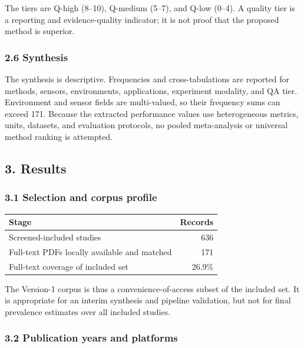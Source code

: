 \documentclass[
  journal]{IEEEtran}
\newcounter{none} %
\begin{document}
The tiers are Q-high (8--10), Q-medium (5--7), and Q-low (0--4). A
quality tier is a reporting and evidence-quality indicator; it is not
proof that the proposed method is superior.

\subsubsection{2.6 Synthesis}\label{26-synthesis}

The synthesis is descriptive. Frequencies and cross-tabulations are
reported for methods, sensors, environments, applications, experiment
modality, and QA tier. Environment and sensor fields are multi-valued,
so their frequency sums can exceed 171. Because the extracted
performance values use heterogeneous metrics, units, datasets, and
evaluation protocols, no pooled meta-analysis or universal method
ranking is attempted.

\subsection{3. Results}\label{3-results}

\subsubsection{3.1 Selection and corpus
profile}\label{31-selection-and-corpus-profile}

{\def\LTcaptype{none} %
\begin{tabularx}{\columnwidth}{@{}Xr@{}}
\toprule\noalign{}
Stage & Records \\
\midrule\noalign{}
\endhead
\bottomrule\noalign{}
\endlastfoot
Screened-included studies & 636 \\
Full-text PDFs locally available and matched & 171 \\
Full-text coverage of included set & 26.9\% \\
\end{tabularx}
}

The Version-1 corpus is thus a convenience-of-access subset of the
included set. It is appropriate for an interim synthesis and pipeline
validation, but not for final prevalence estimates over all included
studies.

\subsubsection{3.2 Publication years and
platforms}\label{32-publication-years-and-platforms}
\end{document}
